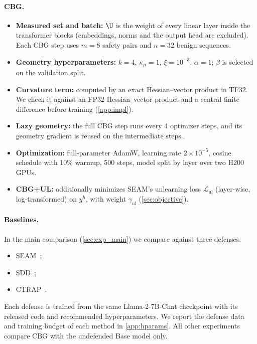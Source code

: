 \paragraph{CBG.}
\begin{itemize}
  \item \textbf{Measured set and batch:} $\U$ is the weight of every linear layer inside the transformer blocks (embeddings, norms and the output head are excluded). Each CBG step uses $m=8$ safety pairs and $n=32$ benign sequences.
  \item \textbf{Geometry hyperparameters:} $k=4$, $\kappa_\mu=1$, $\xi=10^{-3}$, $\alpha=1$; $\beta$ is selected on the validation split.
  \item \textbf{Curvature term:} computed by an exact Hessian--vector product in TF32. We check it against an FP32 Hessian--vector product and a central finite difference before training (\cref{app:impl}).
  \item \textbf{Lazy geometry:} the full CBG step runs every 4 optimizer steps, and its geometry gradient is reused on the intermediate steps.
  \item \textbf{Optimization:} full-parameter AdamW, learning rate $2\times10^{-5}$, cosine schedule with 10\% warmup, 500 steps, model split by layer over two H200 GPUs.
  \item \textbf{CBG+UL:} additionally minimizes SEAM's unlearning loss $\mathcal L_{\mathrm{ul}}$ (layer-wise, log-transformed) on $y^h$, with weight $\gamma_{\mathrm{ul}}$ (\cref{sec:objective}).
\end{itemize}

\paragraph{Baselines.}
In the main comparison (\cref{sec:exp_main}) we compare against three defenses:
\begin{itemize}
  \item SEAM~\citep{wang2026seam};
  \item SDD~\citep{chen2025sdd};
  \item CTRAP~\citep{yi2025ctrap}.
\end{itemize}
Each defense is trained from the same Llama-2-7B-Chat checkpoint with its released code and recommended hyperparameters. We report the defense data and training budget of each method in \cref{app:hparams}. All other experiments compare CBG with the undefended Base model only.

